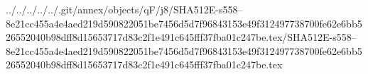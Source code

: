 ../../../../../.git/annex/objects/qF/j8/SHA512E-s558--8e21cc455a4e4aed219d590822051be7456d5d7f96843153e49f312497738700fe62e6bb526552040b98dff8d15653717d83c2f1e491c645fff37fba01c247be.tex/SHA512E-s558--8e21cc455a4e4aed219d590822051be7456d5d7f96843153e49f312497738700fe62e6bb526552040b98dff8d15653717d83c2f1e491c645fff37fba01c247be.tex